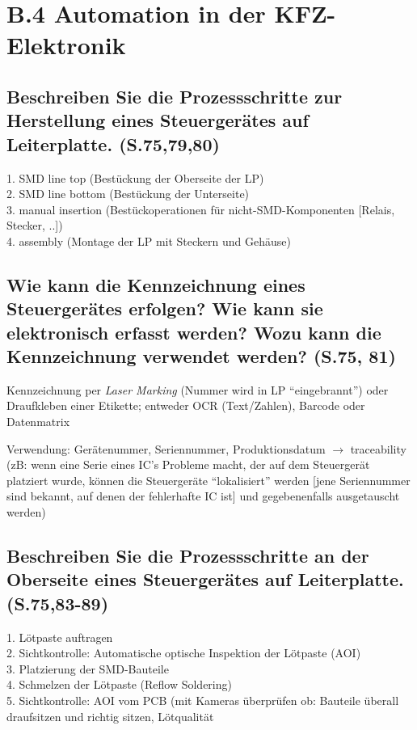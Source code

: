 \section*{B.4 Automation in der KFZ-Elektronik}

\subsection{Beschreiben Sie die Prozessschritte zur Herstellung eines Steuergerätes auf Leiterplatte. (S.75,79,80)}
1. SMD line top (Bestückung der Oberseite der LP) \\
2. SMD line bottom (Bestückung der Unterseite) \\
3. manual insertion (Bestückoperationen für nicht-SMD-Komponenten [Relais, Stecker, ..]) \\
4. assembly (Montage der LP mit Steckern und Gehäuse)

\subsection{Wie kann die Kennzeichnung eines Steuergerätes erfolgen? Wie kann sie elektronisch erfasst werden? Wozu kann die Kennzeichnung verwendet werden? (S.75, 81)}
Kennzeichnung per \emph{Laser Marking} (Nummer wird in LP ``eingebrannt'') oder Draufkleben einer
Etikette; entweder OCR (Text/Zahlen), Barcode oder Datenmatrix

Verwendung: Gerätenummer, Seriennummer, Produktionsdatum $\rightarrow$ traceability (zB: wenn eine
Serie eines IC's Probleme macht, der auf dem Steuergerät platziert wurde, können die Steuergeräte
``lokalisiert'' werden [jene Seriennummer sind bekannt, auf denen der fehlerhafte IC ist] und 
gegebenenfalls ausgetauscht werden)

\subsection{Beschreiben Sie die Prozessschritte an der Oberseite eines Steuergerätes auf Leiterplatte. (S.75,83-89)}
1. Lötpaste auftragen \\
2. Sichtkontrolle: Automatische optische Inspektion der Lötpaste (AOI) \\
3. Platzierung der SMD-Bauteile \\
4. Schmelzen der Lötpaste (Reflow Soldering) \\
5. Sichtkontrolle: AOI vom PCB (mit Kameras überprüfen ob: Bauteile überall draufsitzen und richtig 
sitzen, Lötqualität

